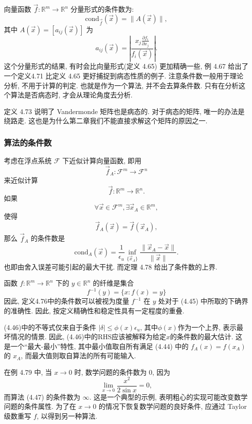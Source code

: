 \documentclass[a4paper]{ctexart}
\begin{document}
 向量函数 $\vec{f}: \mathbb{R}^m \to \mathbb{R}^n$
分量形式的条件数为:
$$
\mbox{cond}_{\vec{f}}(\vec{x}) = \|A(\vec{x})\|,
$$
其中 $A(\vec{x}) = [a_{ij}(\vec{x})]$ 为
$$
a_{ij}(\vec{x})
= \left|\frac{x_j\frac{\partial f_i}{\partial x_j}}{f_i(\vec{x})}\right|.
$$
这个分量形式的结果, 有时会比向量形式(定义 4.65) 更加精确一些, 例 4.67 给出了一个定义4.71 
比定义 4.65 更好捕捉到病态性质的例子. 注意条件数一般用于理论分析, 
不用于计算的判定. 也就是作为一个算法, 并不会去算条件数. 只有在分析这个算法是否病态时, 
才会从理论角度去分析.

定义 4.73 说明了 Vandermonde
矩阵也是病态的. 对于病态的矩阵, 唯一的办法是绕路走. 
这也是为什么第二章我们不能直接求解这个矩阵的原因之一.

\subsubsection{算法的条件数}

 考虑在浮点系统 $\mathscr{F}$ 下近似计算向量函数,
即用
$$
\vec{f}_A : \mathscr{F}^m \to \mathscr{F}^n
$$
来近似计算
$$
\vec{f} : \mathbb{R}^m \to \mathbb{R}^n.
$$
如果
$$
\forall \vec{x} \in \mathscr{F}^m, \exists \vec{x}_A \in \mathbb{R}^m,
$$
使得
$$
\vec{f}_A(\vec{x}) = \vec{f}(\vec{x}_A),
$$
那么 $\vec{f}_A$ 的条件数是
$$
\mbox{cond}_A (\vec{x}) = \frac{1}{\epsilon_u}
\inf_{\{\vec{x}_A\}}\frac{\|\vec{x}_A - \vec{x}\|}{\|\vec{x}\|}.
$$
也即由舍入误差可能引起的最大干扰. 而定理 4.78 给出了条件数的上界.

\begin{remark}

  函数 $f : \mathbb{R}^m \rightarrow \mathbb{R}^n$ 下的 $y \in \mathbb{R}^n$ 的纤维是集合
\[f^{-1}(y) = \{x : f(x) = y\}\]
因此, 定义4.76中的条件数可以被视为度量 $f^{-1}$ 在 $y$ 处对于 (4.45) 中所取的下确界的准确性. 
因此, 按定义精确性和稳定性具有一定程度的重叠.

(4.46)中的不等式仅来自于条件 $|\delta| \leq \phi(x)\epsilon_u$,
其中$\phi(x)$作为一个上界, 表示最坏情况的情景. 因此, (4.46)中的RHS应该被解释为给定$x$的条件数的最大估计. 
这是一个``最大-最小''特性, 其中最小值取自所有满足 (4.44) 中的 $f_A(x) = f(x_A)$ 的 $x_A$, 
而最大值则取自算法的所有可能输入. 

在例 4.79 中, 当 $x \rightarrow 0$ 时, 数学问题的条件数为 $0$, 
因为 
$$
\lim_{x\rightarrow0} \frac{x^2}{2\sin x} = 0,
$$
而算法 (4.47) 的条件数为 $\infty$. 这是一个典型的示例, 表明粗心的实现可能改变数学问题的条件属性. 
为了在 $x \rightarrow 0$ 的情况下恢复数学问题的良好条件, 应通过 Taylor 级数重写 $f$, 以得到另一种算法.
\end{remark}
\end{document}
